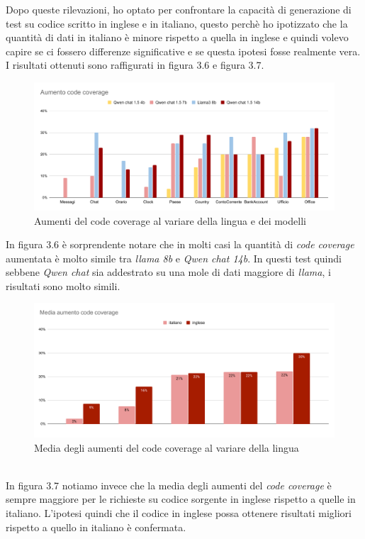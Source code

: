  \newpage   Dopo queste rilevazioni, ho optato per confrontare la capacità di generazione di test su codice scritto in inglese e in italiano, questo perchè ho ipotizzato che
    la quantità di dati in italiano è minore rispetto a quella in inglese e quindi volevo capire se ci fossero differenze significative e se questa ipotesi fosse realmente vera.
    I risultati ottenuti sono raffigurati in figura 3.6 e figura 3.7.
    \begin{figure}[!h]
        \centering        
        \includegraphics[width=14.5cm]{img/Aumento code coverage.pdf}
        \caption{Aumenti del code coverage al variare della lingua e dei modelli}
    \end{figure}
   \newline In figura 3.6  è sorprendente notare che in molti casi la quantità di \textit{code coverage} aumentata è molto simile tra \textit{llama 8b} e \textit{Qwen chat 14b}.
    In questi test quindi sebbene \textit{Qwen chat} sia addestrato su una mole di dati maggiore di \textit{llama}, i risultati sono molto simili.
    \begin{figure}[!h]
        \centering        
        \includegraphics[width=14.5cm]{img/Media aumento code coverage.pdf}
        \caption{Media degli aumenti del code coverage al variare della lingua}
    \end{figure}
    \\In figura 3.7 notiamo invece che la media degli aumenti del \textit{code coverage} è sempre maggiore per le richieste su codice sorgente in inglese rispetto a quelle in italiano.
    L'ipotesi quindi che il codice in inglese possa ottenere risultati migliori rispetto a quello in italiano è confermata.
    \newpage
